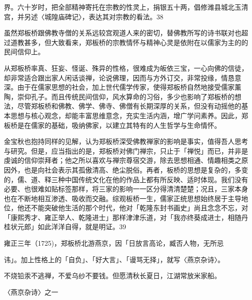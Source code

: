 \noindent 界。六十岁时，把全部精神寄托在宗教的性灵上，捐银五十两，倡修潍县城北玉清宫，并另述〈城隍庙碑记〉，表达其对宗教的看法。38

虽然郑板桥跟佛教寺僧的关系远较宫观道人来的密切，替佛教所写的诗书联对也超过道教甚多，但大致看来，郑板桥的宗教情怀与精神心灵是依附在以儒家为主的的民间信仰上。


从郑板桥率真、狂妄、怪诞、殊异的性格，很难成为皈依三宝，一心向佛的信徒，却非常适合跟出家人闲话谈禅，论说佛理，因而与方外订交，非常投缘，情恳意深。由于在儒家思想的社会，加上世代儒学传家，使得郑板桥自然地接受儒家薰陶，崇仰孔子。而且传统民间信仰，风水算命的习俗，多少也影响了郑板桥的想法，尽管郑板桥和佛教、佛学、佛寺、佛僧有长期深厚的关系，但没有动摇他的基本思想与核心观念，却能丰富思维意念，充实生活内涵，增广学问素养。因此，郑板桥是在儒家的基础，吸纳佛家，以建立其特有的人生哲学与生命情怀。

金宝秋也抱持同样的见解，认为郑板桥深受佛教禅家的影响是事实，值得吾人思考与研究。但是，应当指出的是，郑板桥对佛门禅宗，只止于「禅悦」而已，并非是虔诚的信仰崇拜者；他之所以喜欢与禅宗尊宿交游，除去思想相通、情趣相类之原因外，也是向社会表示其孤傲清高、绝尘脱俗。再者，板桥的思想是复杂的，多变的，儒、道、释三种中国传统文化在他的作品上都有所反映、适时体现。我们没有必要、也很难如贴标签那样，将三家的影响一一区分得清清楚楚；况且，三家本身也在不断地相互渗透、吸收而交融。综观板桥一生，儒家正统思想始终居于主导地位，他还不能突破他生活的那个时代，他对「乾隆东封书画史」尚且念念不忘，对「康熙秀才、雍正举人、乾隆进士」那样津津乐道，对「我亦终葵成进士，相随丹桂状元郎」如此洋洋自得，就是明证。39

雍正三年（1725)，郑板桥北游燕京，因「日放言高论，臧否人物，无所忌

\vfill
\begin{BookNotes}
\end{BookNotes}

\noindent 讳」。加上性格上的「自负」、「好大言」、「谩骂无择」，就写〈燕京杂诗〉。

\begin{BookQuote}
不烧铅汞不逃禅，不爱乌纱不要钱。但愿清秋长夏日，江湖常放米家船。
\end{BookQuote}

〈燕京杂诗〉之一


